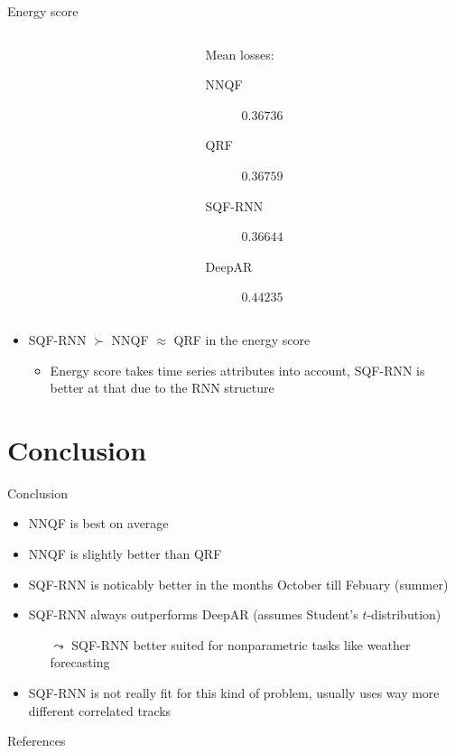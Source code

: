 \documentclass[10pt,aspectratio=169]{beamer}
\begin{document}
\begin{frame}[fragile]{Energy score}
    \begin{columns}
    \begin{column}{0.5\textwidth}
    \begin{flushright}
        
    \end{flushright}
    \end{column}
    \begin{column}{0.5\textwidth}
    Mean losses:
    \begin{description}
        \item[\textcolor{TolDarkBlue}{NNQF}] \(0.36736\)
        \item[\textcolor{TolLightBrown}{QRF}] \(0.36759\)
        \item[\textcolor{TolLightGreen}{SQF-RNN}] \(0.36644\)
        \item[\textcolor{TolDarkBrown}{DeepAR}] \(0.44235\)
    \end{description}
    \end{column}
    \end{columns}
    
    \begin{itemize}
        \item SQF-RNN \(\succ\) NNQF \(\approx\) QRF in the energy score
        \begin{itemize}
            \item Energy score takes time series attributes into account, SQF-RNN is better at that due to the RNN structure
        \end{itemize}
    \end{itemize}
\end{frame}

\section{Conclusion}

\begin{frame}{Conclusion}
    \begin{itemize}
        \item NNQF is best on average
        \item NNQF is slightly better than QRF
        \item SQF-RNN is noticably better in the months October till Febuary (summer)
        \item SQF-RNN always outperforms DeepAR (assumes Student's \(t\)-distribution)
        \begin{itemize}
            \item[\(\leadsto\)] SQF-RNN better suited for nonparametric tasks like weather forecasting
        \end{itemize}
        \item SQF-RNN is not really fit for this kind of problem, usually uses way more different correlated tracks
    \end{itemize}
\end{frame}

\begin{frame}[allowframebreaks]{References}
    \footnotesize
    \printbibliography[heading=none]
\end{frame}
\end{document}
